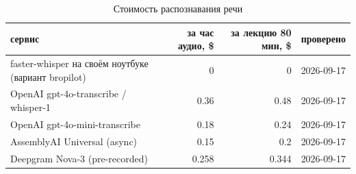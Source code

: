 \begin{table}[H]
\centering
\caption{Стоимость распознавания речи}\label{tab:cost-asr}
\small
\begin{tabular}{@{}lrrl@{}}
\toprule
сервис & за час аудио, \$ & за лекцию 80 мин, \$ & проверено \\
\midrule
faster-whisper на своём ноутбуке (вариант bropilot) & 0 & 0 & 2026-09-17 \\
OpenAI gpt-4o-transcribe / whisper-1 & 0.36 & 0.48 & 2026-09-17 \\
OpenAI gpt-4o-mini-transcribe & 0.18 & 0.24 & 2026-09-17 \\
AssemblyAI Universal (async) & 0.15 & 0.2 & 2026-09-17 \\
Deepgram Nova-3 (pre-recorded) & 0.258 & 0.344 & 2026-09-17 \\
\bottomrule
\end{tabular}
\end{table}
